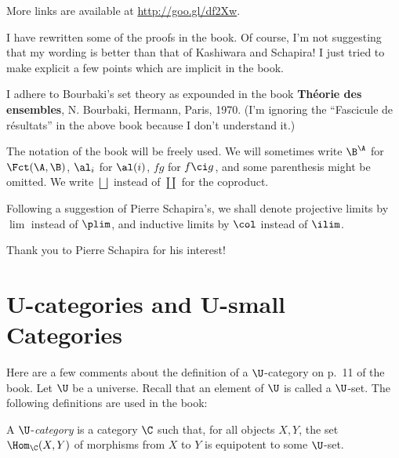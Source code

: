 \documentclass[12pt]{article}
\theoremstyle{remark}
\theoremstyle{definition}
\begin{document}



More links are available at \href{http://goo.gl/df2Xw}{http://goo.gl/df2Xw}. 

I have rewritten some of the proofs in the book. Of course, I'm not suggesting that my wording is better than that of Kashiwara and Schapira! I just tried to make explicit a few points which are implicit in the book. 

I adhere to Bourbaki's set theory as expounded in the book \textbf{Théorie des ensembles}, N. Bourbaki, Hermann, Paris, 1970. (I'm ignoring the ``Fascicule de résultats'' in the above book because I don't understand it.) 

The notation of the book will be freely used. We will sometimes write $\B^\A$ for $\Fct(\A,\B)$, $\al_i$ for $\al(i)$, $fg$ for $f\ci g$, and some parenthesis might be omitted. We write $\bigsqcup$\index{$\bigsqcup$} instead of $\coprod$\index{$\coprod$} for the coproduct. 

Following a suggestion of Pierre Schapira's, we shall denote projective limits by $\lim$\index{$\lim$} instead of $\plim$\index{$\plim$}, and inductive limits by $\col$\index{$\col$} instead of $\ilim$\index{$\ilim$}. 

Thank you to Pierre Schapira for his interest!


\section{U-categories and U-small Categories}

Here are a few comments about the definition of a $\U$-category on p.~11 of the book. Let $\U$ be a universe. Recall that an element of $\U$ is called a $\U$-set. The following definitions are used in the book: 

\begin{df}[$\U$-category] 
A $\U$-{\em category} is a category $\C$ such that, for all objects $X,Y$, the set $\Hom_\C(X,Y)$ of morphisms from $X$ to $Y$ is equipotent to some $\U$-set. 
\end{df} 
\end{document}
